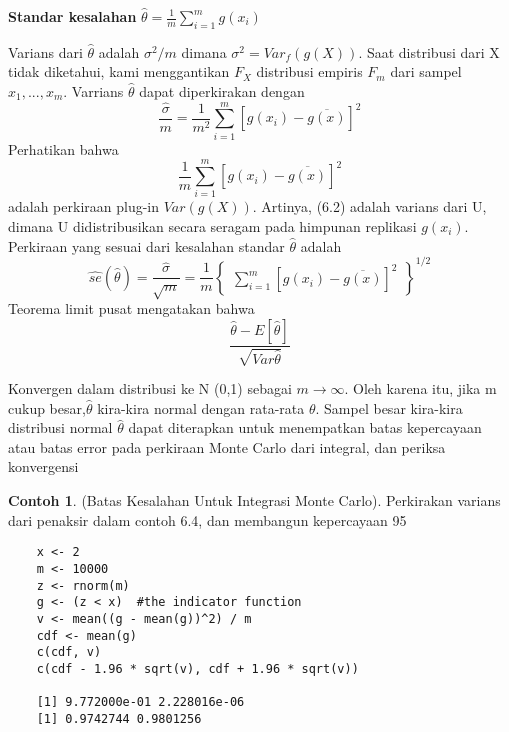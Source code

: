 \documentclass[a4paper,12pt]{article}
\theoremstyle{definition}
\newtheorem{example}{Contoh}[section]
\begin{document}
\textbf{Standar kesalahan}
 $\widehat{\theta }= \frac{1}{m}\sum_{i=1}^{m}g(x_{i})$

Varians dari $\widehat{\theta }$ adalah $\sigma ^{2}/m$ dimana $\sigma ^{2}= Var_{f}(g(X))$. Saat distribusi dari X tidak diketahui, kami menggantikan $F_{X}$ distribusi empiris $F_{m}$ dari sampel $x_{1},...,x_{m}$. Varrians $\widehat{\theta }$ dapat diperkirakan dengan
\begin{equation}
    \frac{\widehat{\sigma }}{m}= \frac{1}{m^{2}}\sum_{i=1}^{m}[g(x_{i})-\overline{g(x)}]^{2}
\end{equation}
Perhatikan bahwa
\begin{equation}
    \frac{1}{m}\sum_{i=1}^{m}[g(x_{i})-\overline{g(x)}]^{2}
\end{equation}
adalah perkiraan plug-in $Var(g(X))$. Artinya, (6.2) adalah varians dari U, dimana U didistribusikan secara seragam pada himpunan replikasi ${g(x_{i})}$. Perkiraan yang sesuai dari kesalahan standar $\widehat{\theta }$ adalah
\begin{equation}
    \widehat{se}(\widehat{\theta })= \frac{\widehat{\sigma }}{\sqrt{m}}= \frac{1}{m}\begin{Bmatrix}
\sum_{i=1}^{m}[g(x_{i})-\overline{g(x)}]^{2}
\end{Bmatrix}^{1/2}
\end{equation}
Teorema limit pusat mengatakan bahwa
\begin{equation}
    \frac{\widehat{\theta }-E[\widehat{\theta }]}{\sqrt{Var\widehat{\theta }}}
\end{equation}

Konvergen dalam distribusi ke N (0,1) sebagai $m\rightarrow \infty $. Oleh karena itu, jika m cukup besar,$\widehat{\theta }$ kira-kira normal dengan rata-rata $\theta$. Sampel besar kira-kira distribusi normal $\widehat{\theta }$ dapat diterapkan untuk menempatkan batas kepercayaan atau batas error pada perkiraan Monte Carlo dari integral, dan periksa konvergensi

\begin{example}
    (Batas Kesalahan Untuk Integrasi Monte Carlo). Perkirakan varians dari penaksir dalam contoh 6.4, dan membangun kepercayaan 95%
\end{example}

\begin{lstlisting}
    x <- 2
    m <- 10000
    z <- rnorm(m)
    g <- (z < x)  #the indicator function
    v <- mean((g - mean(g))^2) / m
    cdf <- mean(g)
    c(cdf, v)
    c(cdf - 1.96 * sqrt(v), cdf + 1.96 * sqrt(v))

    [1] 9.772000e-01 2.228016e-06
    [1] 0.9742744 0.9801256
\end{lstlisting}
\end{document}
